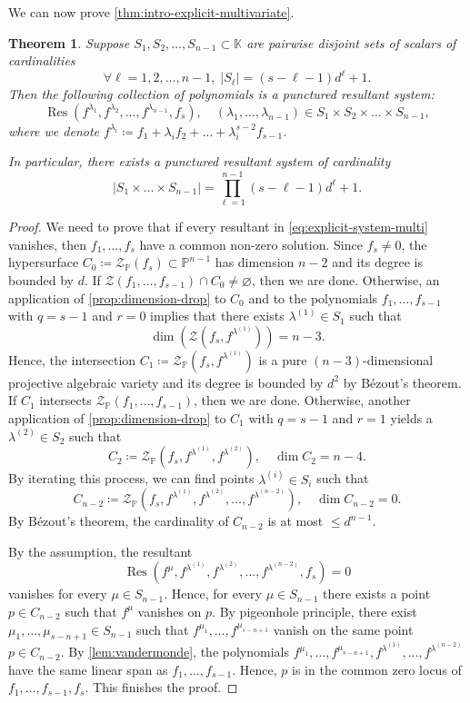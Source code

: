 \documentclass[11pt,a4paper]{article}
\newtheorem{theorem}{Theorem}[section]
\numberwithin{equation}{section}
\newcommand{\PP}{\mathbb{P}}
\newcommand{\KK}{\mathbb{K}}
\newcommand{\cZ}{\mathcal{Z}}
\DeclareMathOperator{\Res}{Res}
\begin{document}
We can now prove \cref{thm:intro-explicit-multivariate}.
\begin{theorem}
\label{thm:explicit-multivariate}
Suppose $S_1,S_2,\dots,S_{n-1}\subset\KK$ are pairwise disjoint sets of scalars of cardinalities \[
\forall \ell=1,2,\dots,n-1, \; |S_{\ell}| = (s-\ell-1)d^{\ell}+1.
\] Then the following collection of polynomials is a punctured resultant system: \begin{equation}
\label{eq:explicit-system-multi}
\Res(f^{\lambda_1}, f^{\lambda_2},\dots, f^{\lambda_{n-1}}, f_s),\quad (\lambda_1,\dots,\lambda_{n-1})\in S_1 \times S_2\times\dots\times S_{n-1},
\end{equation} where we denote $f^{\lambda_i}\coloneqq f_1 + \lambda_i f_2 +\dots + \lambda_i^{s-2} f_{s-1}$.

In particular, there exists a punctured resultant system of cardinality \[
|S_1\times\dots\times S_{n-1}| = \prod_{\ell=1}^{n-1} (s-\ell-1) d^{\ell} + 1.
\] 
\end{theorem}
\begin{proof}
We need to prove that if every resultant in \eqref{eq:explicit-system-multi} vanishes, then $f_1,\dots,f_s$ have a common non-zero solution.
Since $f_s\neq 0$, the hypersurface $C_0\coloneqq \cZ_{\PP}(f_s)\subset\PP^{n-1}$ has dimension $n-2$ and its degree is bounded by $d$. 
If $\cZ(f_1,\dots,f_{s-1})\cap C_0\neq\varnothing$, then we are done.
Otherwise, an application of \cref{prop:dimension-drop} to $C_0$ and to the polynomials $f_1,\dots,f_{s-1}$ with $q=s-1$ and $r=0$ implies that there exists $\lambda^{(1)}\in S_1$ such that \[
\dim\left(\cZ(f_s,f^{\lambda^{(1)}})\right) = n-3.
    \] 
    Hence, the intersection $C_1\coloneqq\cZ_{\PP}(f_s,f^{\lambda^{(1)}})$ is a pure $(n-3)$-dimensional projective algebraic variety and its degree is bounded by $d^2$ by B\'{e}zout's theorem.
    If $C_1$ intersects $\cZ_{\PP}(f_1,\dots,f_{s-1})$, then we are done. 
    Otherwise, another application of \cref{prop:dimension-drop} to $C_1$ with $q=s-1$ and $r=1$ yields a $\lambda^{(2)}\in S_2$ such that \[
    C_2\coloneqq \cZ_{\PP}(f_s,f^{\lambda^{(1)}},f^{\lambda^{(2)}}),\quad \dim C_2 = n-4.
    \] By iterating this process, we can find points $\lambda^{(i)}\in S_i$ such that \[
    C_{n-2}\coloneqq \cZ_{\PP}(f_s,f^{\lambda^{(1)}},f^{\lambda^{(2)}},\dots,f^{\lambda^{(n-2)}}),\quad \dim C_{n-2} = 0.
    \] By B\'{e}zout's theorem, the cardinality of $C_{n-2}$ is at most $\leq d^{n-1}$.

    By the assumption, the resultant \[
    \Res(f^{\mu},f^{\lambda^{(1)}},f^{\lambda^{(2)}},\dots,f^{\lambda^{(n-2)}},f_s) = 0
    \] vanishes for every $\mu\in S_{n-1}$.
    Hence, for every $\mu\in S_{n-1}$ there exists a point $p\in C_{n-2}$ such that $f^{\mu}$ vanishes on $p$.
    By pigeonhole principle, there exist $\mu_1,\dots,\mu_{s-n+1}\in S_{n-1}$ such that $f^{\mu_1},\dots,f^{\mu_{s-n+1}}$ vanish on the same point $p\in C_{n-2}$. 
    By \cref{lem:vandermonde},
    the polynomials $f^{\mu_1},\dots,f^{\mu_{s-n+1}}, f^{\lambda^{(1)}},\dots,f^{\lambda^{(n-2)}}$ have the same linear span as $f_1,\dots,f_{s-1}$.
    Hence, $p$ is in the common zero locus of $f_1,\dots,f_{s-1},f_s$.
    This finishes the proof.
\end{proof}
\end{document}
